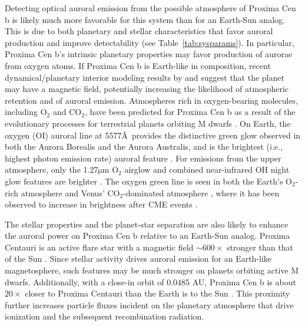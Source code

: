 \documentclass{emulateapj}
\begin{document}
Detecting optical auroral emission from the possible atmosphere of Proxima Cen b is likely much more favorable for this system than for an Earth-Sun analog. This is due to both planetary and stellar characteristics that favor auroral production and improve detectability (see Table~\ref{tab:sysparams}). In particular, Proxima Cen b's intrinsic planetary properties may favor production of aurorae from oxygen atoms. If Proxima Cen b is Earth-like in composition, recent dynamical/planetary interior modeling results by \citet{Barnes2016} and \citet{Zuluaga2016} suggest that the planet may have a magnetic field, potentially increasing the likelihood of atmospheric retention and of auroral emission. Atmospheres rich in oxygen-bearing molecules, including O$_2$ and CO$_2$, have been predicted for Proxima Cen b \citep{Meadows2016} as a result of the evolutionary processes for terrestrial planets orbiting M dwarfs \citep{LugerBarnes2015,Barnes2016}. On Earth, the oxygen (OI) auroral line at 5577\AA\ provides the distinctive green glow observed in both the Aurora Borealis and the Aurora Australis, and is the brightest (i.e., highest photon emission rate) auroral feature \citep{Chamberlain1961, Dempsey2005}. For emissions from the upper atmosphere, only the 1.27$\mathrm{\mu}$m O$_2$ airglow and combined near-infrared OH night glow features are brighter \citep{Hunten1967}. The oxygen green line is seen in both the Earth's O$_2$-rich atmosphere \citep{Chamberlain1961} and Venus' CO$_2$-dominated atmosphere \citep{Slanger2001}, where it has been observed to increase in brightness after CME events \citep{Gray2014}.

The stellar properties and the planet-star separation are also likely to enhance the auroral power on Proxima Cen b relative to an Earth-Sun analog. Proxima Centauri is an active flare star with a magnetic field ${\sim} 600\times$ stronger than that of the Sun \citep{Reiners2008,Davenport2016}. Since stellar activity drives auroral emission for an Earth-like magnetosphere, such features may be much stronger on planets orbiting active M dwarfs. Additionally, with a close-in orbit of 0.0485 AU, Proxima Cen b is about $20\times$ closer to Proxima Centauri than the Earth is to the Sun \citep{Anglada-Escude2016}. This proximity further increases particle fluxes incident on the planetary atmosphere that drive ionization and the subsequent recombination radiation.
\end{document}
